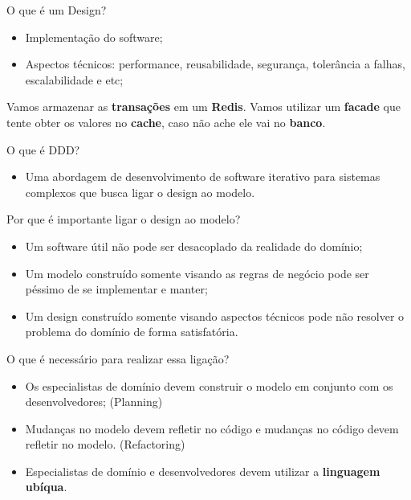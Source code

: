 \documentclass[aspectratio=169]{beamer}
\begin{document}
\begin{frame}{O que é um Design?}	
	\begin{itemize}	
		\item Implementação do software;
		\item Aspectos técnicos: performance, reusabilidade, segurança, tolerância a falhas, escalabilidade e etc;
	\end{itemize}
	Vamos armazenar as \textbf{transações} em um \textbf{Redis}. Vamos utilizar um \textbf{facade} que tente obter os valores no \textbf{cache}, caso não ache ele vai no \textbf{banco}. 
\end{frame}

\begin{frame}{O que é DDD?}	
	\begin{itemize}	
		\item Uma abordagem de desenvolvimento de software iterativo para sistemas complexos que busca ligar o design ao modelo.
	\end{itemize}
\end{frame}

\begin{frame}{Por que é importante ligar o design ao modelo?}	
	\begin{itemize}	
		\item Um software útil não pode ser desacoplado da realidade do domínio;
		\item Um modelo construído somente visando as regras de negócio pode ser péssimo de se implementar e manter;
		\item Um design construído somente visando aspectos técnicos pode não resolver o problema do domínio de forma satisfatória.
	\end{itemize}
\end{frame}

\begin{frame}{O que é necessário para realizar essa ligação?}	
	\begin{itemize}	
		\item Os especialistas de domínio devem construir o modelo em conjunto com os desenvolvedores; (Planning)
		\item Mudanças no modelo devem refletir no código e mudanças no código devem refletir no modelo. (Refactoring)
		\item Especialistas de domínio e desenvolvedores devem utilizar a \textbf{linguagem ubíqua}.
	\end{itemize}
\end{frame}
\end{document}

